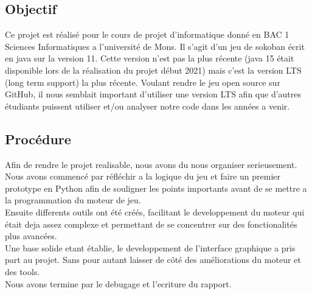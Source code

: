 \documentclass[../main.tex]{subfiles}
\begin{document}
\subsection{Objectif}
Ce projet est réalisé pour le cours de projet d'informatique donné en BAC 1 Sciences Informatiques a l'université de Mons.
Il s'agit d'un jeu de sokoban écrit en java sur la version 11.
Cette version n'est pas la plus récente (java 15 était disponible lors de la réalisation du projet début 2021) mais c'est la version LTS (long term support) la plus récente.
Voulant rendre le jeu open source sur GitHub, il nous semblait important d'utiliser une version LTS afin que d'autres étudiants puissent utiliser et/ou analyser notre code dans les années a venir.

\subsection{Procédure}
Afin de rendre le projet realisable, nous avons du nous organiser serieusement. \\
Nous avons commencé par réfléchir a la logique du jeu et faire un premier prototype en Python afin de souligner les points importants avant de se mettre a la programmation du moteur de jeu. \\
Ensuite differents outils ont été créés, facilitant le developpement du moteur qui était deja assez complexe et permettant de se concentrer sur des fonctionalités plus avancées. \\
Une base solide etant établie, le developpement de l'interface graphique a pris part au projet. Sans pour autant laisser de côté des améliorations du moteur et des tools. \\
Nous avons termine par le debugage et l'ecriture du rapport.

\newpage
\end{document}
